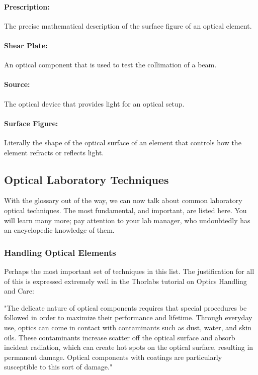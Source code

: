 \documentclass[11pt]{article}
\begin{document}
\paragraph{Prescription:} The precise mathematical description of the surface figure of an optical element.
\vspace{-10pt}
\paragraph{Shear Plate:} 
An optical component that is used to test the collimation of a beam.
\vspace{-10pt}
\paragraph{Source:} 
The optical device that provides light for an optical setup. 
\vspace{-10pt}
\paragraph{Surface Figure:} Literally the shape of the optical surface of an element that controls how the element refracts or reflects light.

\subsection{Optical Laboratory Techniques}

With the glossary out of the way, we can now talk about common laboratory optical techniques. The most fundamental, and important, are listed here. You will learn many more; pay attention to your lab manager, who undoubtedly has an encyclopedic knowledge of them. 

\subsubsection{Handling Optical Elements}

Perhaps the most important set of techniques in this list. The justification for all of this is expressed extremely well in the Thorlabs tutorial on Optics Handling and Care:\cite{website:ThorLabs}

\begin{displayquote}
    "The delicate nature of optical components requires that special procedures be followed in order to maximize their performance and lifetime. Through everyday use, optics can come in contact with contaminants such as dust, water, and skin oils. These contaminants increase scatter off the optical surface and absorb incident radiation, which can create hot spots on the optical surface, resulting in permanent damage. Optical components with coatings are particularly susceptible to this sort of damage."\cite{website:ThorLabs}
\end{displayquote}
\end{document}
